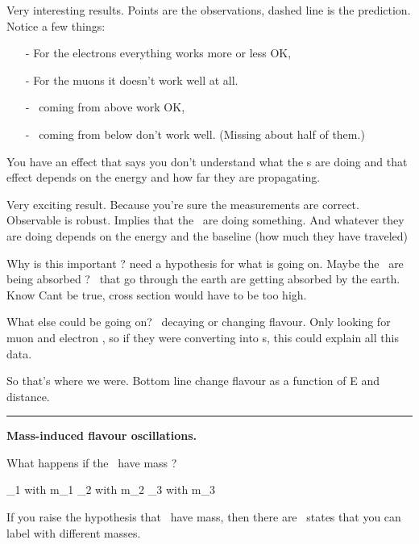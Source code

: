 {Very interesting results.
Points are the observations, dashed line is the prediction.
Notice a few things:
\begin{itemize}
\item[-] For the electrons everything works more or less OK, 
\item[-] For the muons it doesn't work well at all.
\item[-] \nus\ coming from above work OK, 
\item[-] \nus\ coming from below don't work well. (Missing about half of them.)
\end{itemize}
You have an effect that says you don't understand what the \numu s are doing and that effect depends on the energy and how far they are propagating.


Very exciting result. 
Because you're sure the measurements are correct. 
Observable is robust. 
Implies that the \nus\ are doing something. 
And whatever they are doing depends on the energy and the baseline (how much they have traveled)

Why is this important ? need a hypothesis for what is going on. 
Maybe the \nus\ are being absorbed ? 
\nus\ that go through the earth are getting absorbed by the earth. 
Know Cant be true,  cross section would have to be too high. 

What else could be going on?
\nus\ decaying or changing flavour.
Only looking for muon and electron \nus, so if they were converting into \nutau s, this could explain all this data.




So that's where we were. 
Bottom line \nus change flavour as a function of E and distance. 

\noindent\rule{\textwidth}{1pt}

\textbf{Mass-induced flavour oscillations.}

What happens if the \nus\ have mass ?

\be
\nu_1 \textrm{ with } m_1
\ee
\be
\nu_2 \textrm{ with } m_2
\ee
\be
\nu_3 \textrm{ with } m_3
\ee

If you raise the hypothesis that \nus\ have mass, then there are \nus\ states that you can label with different masses.

}

